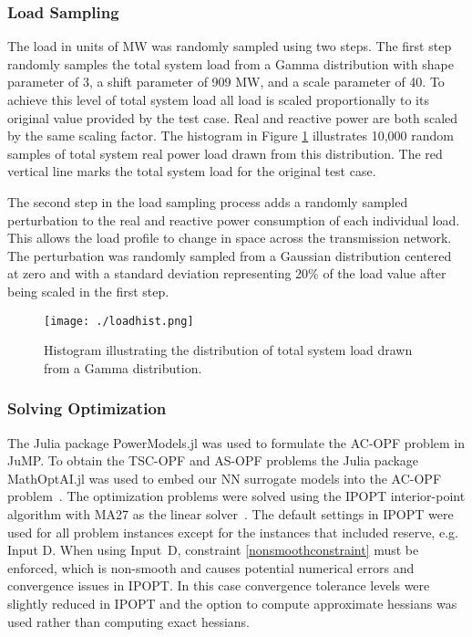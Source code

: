 \documentclass[lettersize,journal]{IEEEtran}
\begin{document}
\subsubsection{Load Sampling}\label{Sec:LoadSampling}
The load in units of MW was randomly sampled using two steps.  The first step randomly samples the total system load from a Gamma distribution with shape parameter of 3, a shift parameter of 909 MW, and a scale parameter of 40.  To achieve this level of total system load all load is scaled proportionally to its original value provided by the test case.  Real and reactive power are both scaled by the same scaling factor.  The histogram in Figure \ref{loadhist} illustrates 10,000 random samples of total system real power load drawn from this distribution.  The red vertical line marks the total system load for the original test case.  

The second step in the load sampling process adds a randomly sampled perturbation to the real and reactive power consumption of each individual load.  This allows the load profile to change in space across the transmission network.  The perturbation was randomly sampled from a Gaussian distribution centered at zero and with a standard deviation representing 20\% of the load value after being scaled in the first step.
\begin{figure}[h!]
    \centering    \texttt{[image: ./loadhist.png]}
    \caption{Histogram illustrating the distribution of total system load drawn from a Gamma distribution.}\label{loadhist}
\end{figure}

\subsubsection{Solving Optimization}
The Julia package PowerModels.jl was used to formulate the AC-OPF problem in JuMP.  To obtain the TSC-OPF and AS-OPF problems the Julia package MathOptAI.jl was used to embed our NN surrogate models into the AC-OPF problem~\cite{8442948,MathOptAI2024,Lubin2023}.  The optimization problems were solved using the IPOPT interior-point algorithm with MA27 as the linear solver~\cite{wachter2006implementation}.  The default settings in IPOPT were used for all problem instances except for the instances that included reserve, e.g. Input D.  When using Input~D, constraint \eqref{nonsmoothconstraint} must be enforced, which is non-smooth and causes potential numerical errors and convergence issues in IPOPT.  In this case convergence tolerance levels were slightly reduced in IPOPT and the option to compute approximate hessians was used rather than computing exact hessians.  %
\end{document}
